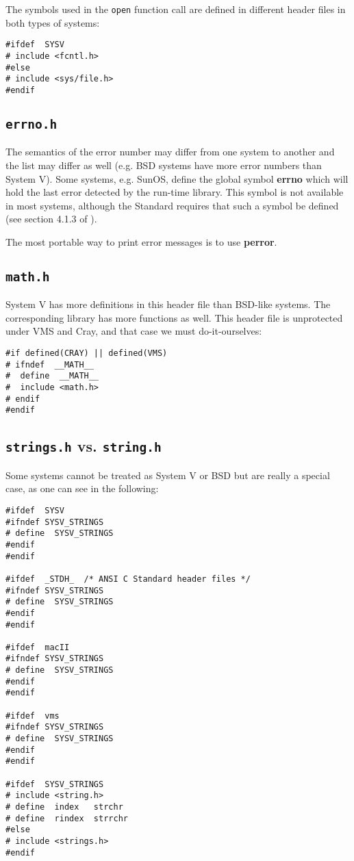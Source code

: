 The symbols used in the {\tt open} function call are defined in different
header files in both types of systems:
\begin{verbatim}
#ifdef  SYSV
# include <fcntl.h>
#else
# include <sys/file.h>
#endif
\end{verbatim}

\subsection{\tt errno.h}

The semantics of the error number may differ from one system to another
and the list may differ as well (e.g. BSD systems have more error numbers
than System V). Some systems, e.g. SunOS, define the global symbol
{\bf errno} which will hold the last error detected by the run-time
library. This symbol is not available in most systems, although the
Standard requires that such a symbol be defined (see
section 4.1.3 of \cite{kn:ansi}).

The most portable way to print error messages is to use {\bf perror}.

\subsection{{\tt math.h}}

System V has more definitions in this header file than BSD-like
systems. The corresponding library has more functions as well. This header
file is unprotected under VMS and Cray, and that case we must do-it-ourselves:
\begin{verbatim}
#if defined(CRAY) || defined(VMS)
# ifndef  __MATH__
#  define  __MATH__
#  include <math.h>
# endif
#endif
\end{verbatim}

\subsection{{\tt strings.h} vs. {\tt string.h}}

Some systems cannot be treated as System V or BSD but are really a special
case, as one can see in the following:

\begin{verbatim}
#ifdef  SYSV
#ifndef SYSV_STRINGS
# define  SYSV_STRINGS
#endif
#endif

#ifdef  _STDH_  /* ANSI C Standard header files */
#ifndef SYSV_STRINGS
# define  SYSV_STRINGS
#endif
#endif

#ifdef  macII
#ifndef SYSV_STRINGS
# define  SYSV_STRINGS
#endif
#endif

#ifdef  vms
#ifndef SYSV_STRINGS
# define  SYSV_STRINGS
#endif
#endif

#ifdef  SYSV_STRINGS
# include <string.h>
# define  index   strchr
# define  rindex  strrchr
#else
# include <strings.h>
#endif
\end{verbatim}


